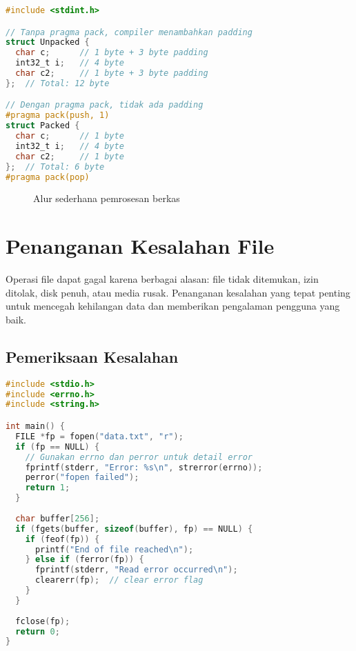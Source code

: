 \documentclass[../main.tex]{subfiles}
\begin{document}
\begin{lstlisting}[language=C, caption={Contoh struct dengan padding control}]
#include <stdint.h>

// Tanpa pragma pack, compiler menambahkan padding
struct Unpacked {
  char c;      // 1 byte + 3 byte padding
  int32_t i;   // 4 byte
  char c2;     // 1 byte + 3 byte padding
};  // Total: 12 byte

// Dengan pragma pack, tidak ada padding
#pragma pack(push, 1)
struct Packed {
  char c;      // 1 byte
  int32_t i;   // 4 byte
  char c2;     // 1 byte
};  // Total: 6 byte
#pragma pack(pop)
\end{lstlisting}

\begin{figure}[H]
  \centering
  \caption{Alur sederhana pemrosesan berkas}
\end{figure}

\section{Penanganan Kesalahan File}

Operasi file dapat gagal karena berbagai alasan: file tidak ditemukan, izin ditolak, disk penuh, atau media rusak. Penanganan kesalahan yang tepat penting untuk mencegah kehilangan data dan memberikan pengalaman pengguna yang baik.

\subsection{Pemeriksaan Kesalahan}

\begin{lstlisting}[language=C, caption={Penanganan kesalahan di C}]
#include <stdio.h>
#include <errno.h>
#include <string.h>

int main() {
  FILE *fp = fopen("data.txt", "r");
  if (fp == NULL) {
    // Gunakan errno dan perror untuk detail error
    fprintf(stderr, "Error: %s\n", strerror(errno));
    perror("fopen failed");
    return 1;
  }
  
  char buffer[256];
  if (fgets(buffer, sizeof(buffer), fp) == NULL) {
    if (feof(fp)) {
      printf("End of file reached\n");
    } else if (ferror(fp)) {
      fprintf(stderr, "Read error occurred\n");
      clearerr(fp);  // clear error flag
    }
  }
  
  fclose(fp);
  return 0;
}
\end{lstlisting}
\end{document}
